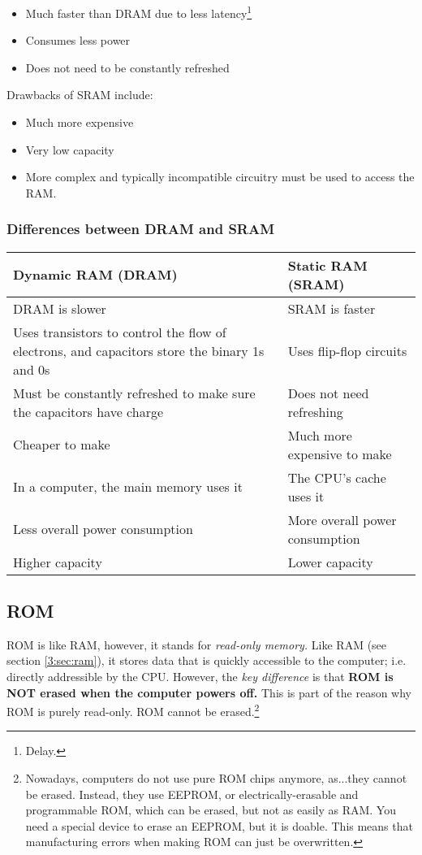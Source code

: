 \documentclass[../main.tex]{subfiles}
\begin{document}
\begin{itemize}
    \item Much faster than DRAM due to less latency\footnote{Delay.}
    \item Consumes less power
    \item Does not need to be constantly refreshed
\end{itemize}

Drawbacks of SRAM include:

\begin{itemize}
    \item Much more expensive
    \item Very low capacity
    \item More complex and typically incompatible circuitry must be used to access the RAM.
\end{itemize}

\subsubsection{Differences between DRAM and SRAM}

\begin{longtable}{|p{}|p{}|}
    \hline 
    \textbf{Dynamic RAM (DRAM)} & \textbf{Static RAM (SRAM)}
    \\ \hline
    DRAM is slower & SRAM is faster
    \\ \hline
    Uses transistors to control the flow of electrons, and capacitors store the binary 1s and 0s & Uses flip-flop circuits
    \\ \hline
    Must be constantly refreshed to make sure the capacitors have charge & Does not need refreshing
    \\ \hline
    Cheaper to make & Much more expensive to make
    \\ \hline
    In a computer, the main memory uses it & The CPU's cache uses it
    \\ \hline
    Less overall power consumption & More overall power consumption
    \\ \hline
    Higher capacity & Lower capacity
    \\ \hline
\end{longtable}

\subsection{ROM}

ROM is like RAM, however, it stands for \emph{read-only memory.} Like RAM (see section \ref{3:sec:ram}), it stores data that is quickly accessible to the computer; i.e. directly addressible by the CPU. However, the \emph{key difference} is that \textbf{ROM is NOT erased when the computer powers off.} This is part of the reason why ROM is purely read-only. ROM cannot be erased.\footnote{Nowadays, computers do not use pure ROM chips anymore, as...they cannot be erased. Instead, they use EEPROM, or electrically-erasable and programmable ROM, which can be erased, but not as easily as RAM. You need a special device to erase an EEPROM, but it is doable. This means that manufacturing errors when making ROM can just be overwritten.}
\end{document}
